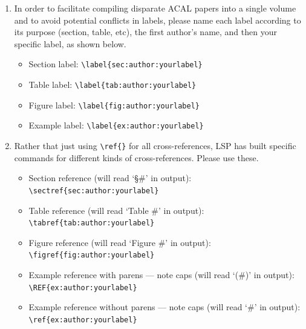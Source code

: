 \documentclass[output=paper,colorlinks,citecolor=brown,
]{langscibook}
\begin{document}
\begin{enumerate}    

\item In order to facilitate compiling disparate ACAL papers into a single volume and to avoid potential conflicts in labels, please name each label according to its purpose (section, table, etc), the first author's name, and then your specific label, as shown below. 

\begin{itemize}

\item Section label: \verb|\label{sec:author:yourlabel}|

\item Table label: \verb|\label{tab:author:yourlabel}|

\item Figure label: \verb|\label{fig:author:yourlabel}|

\item Example label: \verb|\label{ex:author:yourlabel}|

\end{itemize}

    
\item Rather that just using \verb|\ref{}| for all cross-references, LSP has built specific commands for different kinds of cross-references. Please use these.  

\begin{itemize}

\item Section reference (will read `\S \#’ in output):\\ \verb|\sectref{sec:author:yourlabel}|

\item Table reference (will read `Table \#’ in output):\\ \verb|\tabref{tab:author:yourlabel}|

\item Figure reference (will read `Figure \#’ in output): \\ \verb|\figref{fig:author:yourlabel}|

\item Example reference with parens — note caps (will read `(\#)’ in output): \\ \verb|\REF{ex:author:yourlabel}| 

\item Example reference without parens — note caps (will read `\#’ in output): \\ \verb|\ref{ex:author:yourlabel}|

\end{itemize}
\end{enumerate}
\end{document}
